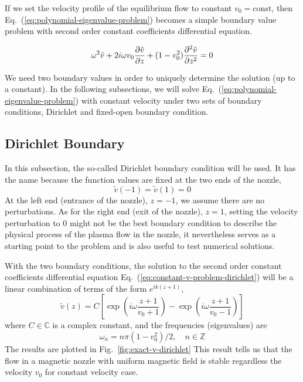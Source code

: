 If we set the velocity profile of the equilibrium flow to constant $v_0=\text{const}$, then Eq.~(\ref{eq:polynomial-eigenvalue-problem}) becomes a simple boundary value problem with second order constant coefficients differential equation.

\begin{equation} \label{eq:constant-v-problem-dirichlet}
	\omega^2\tilde{v} + 2i\omega v_0\pdv{\tilde{v}}{z} + (1-v_0^2)\pdv[2]{\tilde{v}}{z} = 0
\end{equation}

We need two boundary values in order to uniquely determine the solution (up to a constant). In the following subsections, we will solve Eq.~(\ref{eq:polynomial-eigenvalue-problem}) with constant velocity under two sets of boundary conditions, Dirichlet and fixed-open boundary condition.

\subsection{Dirichlet Boundary}
In this subsection, the so-called Dirichlet boundary condition will be used. It has the name because the function values are fixed at the two ends of the nozzle,
\begin{equation}
	\tilde{v}(-1) = \tilde{v}(1) = 0
\end{equation}
At the left end (entrance of the nozzle), $z=-1$, we assume there are no perturbations. As for the right end (exit of the nozzle), $z=1$, setting the velocity perturbation to 0 might not be the best boundary condition to describe the physical process of the plasma flow in the nozzle, it nevertheless serves as a starting point to the problem and is also useful to test numerical solutions.

With the two boundary conditions, the solution to the second order constant coefficients differential equation Eq.~(\ref{eq:constant-v-problem-dirichlet}) will be a linear combination of terms of the form $e^{ik(z+1)}$,
\begin{equation} \label{eq:constant-v-solution-dirichlet}
	\tilde{v}(z) = C\left[ \exp\left(i\omega\frac{z+1}{v_0+1}\right) - \exp\left(i\omega\frac{z+1}{v_0-1}\right) \right]
\end{equation}
where $C\in\mathbb{C}$ is a complex constant, and the frequencies (eigenvalues) are
\begin{equation}
	\omega_n = n\pi(1-v_0^2)/2,\quad n\in\mathbb{Z}
	\label{eq:eigvals-constant-v-dirichlet}
\end{equation}
The results are plotted in Fig.~\ref{fig:exact-v-dirichlet} This result tells us that the flow in a magnetic nozzle with uniform magnetic field is stable regardless the velocity $v_0$ for constant velocity case.

